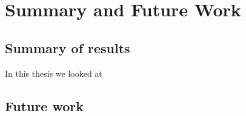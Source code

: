 \renewcommand*\chappic{}
\renewcommand*\chapquote{}
\chapter{Summary and Future Work}
\label{ch:summary}
%
\section{Summary of results}
%
In this thesis we looked at 

\section{Future work}
